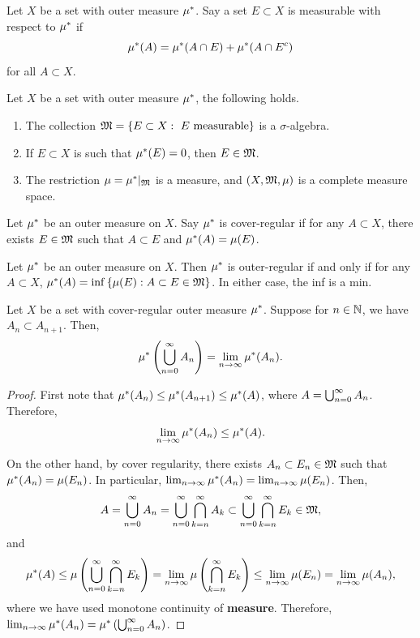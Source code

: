 \documentclass[a4paper]{article}
\begin{document}
\begin{defi}
  Let $X$ be a set with outer measure $\mu^*$. Say 
  a set $E \subset X$ is measurable with respect to 
  $\mu^*$ if 
  \[
  \mu^*(A) = \mu^*(A \cap E) + \mu^*(A \cap E^c) 
  \]
  for all $A \subset X$.
\end{defi}

\begin{thm}
  Let $X$ be a set with outer measure $\mu^*$, the following 
  holds. 
  \begin{enumerate}
    \item The collection $\mathfrak{M} = \left\{ E \subset X: \text{ 
      $E$ measurable} \right\}$ 
      is a $\sigma$-algebra.
    \item If $E \subset X$ is such that $\mu^*(E) = 0$, then 
    $E \in \mathfrak{M}$.
    \item The restriction $\mu = \mu^* \vert_{\mathfrak{M}}$ is a measure, 
    and $(X, \mathfrak{M}, \mu)$ is a complete measure space.
  \end{enumerate}
\end{thm}

\begin{defi}
  Let $\mu^*$ be an outer measure on $X$. Say $\mu^*$
  is cover-regular if for any $A \subset X$, there 
  exists $E \in \mathfrak{M}$ such that $A \subset E$ 
  and $\mu^*(A) = \mu(E)$.
\end{defi}

\begin{prop}
  Let $\mu^*$ be an outer measure on $X$. Then $\mu^*$
  is outer-regular if and only if for any $A \subset X$, 
  $\mu^*(A) = \inf \left\{ \mu(E) : A \subset E \in 
  \mathfrak{M} \right\}$. In either case, the inf is a min.
\end{prop}

\begin{prop}
  Let $X$ be a set with cover-regular outer measure 
  $\mu^*$. Suppose for $n \in \mathbb{N}$, we have $A_n \subset 
  A_{n+1}$. Then, 
  \[
  \mu^* \left( \bigcup_{n=0}^\infty A_n \right) 
  = \lim_{n \to \infty} \mu^*(A_n).
  \]
\end{prop}

\begin{proof}
  First note that $\mu^*(A_n) \leq \mu^*(A_{n+1}) 
  \leq \mu^*(A)$, where $A = \bigcup_{n=0}^\infty A_n$. 
  Therefore, 
  \[
    \lim_{n \to \infty} \mu^*(A_n) \leq \mu^*(A).
  \]

  On the other hand, by cover regularity, there exists 
  $A_n \subset E_n \in \mathfrak{M}$ such that $\mu^*(A_n) = \mu(E_n)$.
  In particular, $\lim_{n \to \infty} \mu^* (A_n) 
  = \lim_{n \to \infty} \mu(E_n)$. Then, 
  \[
  A = \bigcup_{n=0}^\infty A_n = \bigcup_{n=0}^\infty \bigcap_{k=n}^\infty A_k
  \subset \bigcup_{n=0}^\infty \bigcap_{k=n}^\infty E_k \in \mathfrak{M},
  \]
  and 
  \[
  \begin{aligned}
    \mu^*(A) 
    \leq \mu \left( \bigcup_{n=0}^\infty 
    \bigcap_{k=n}^\infty E_k \right) 
    = \lim_{n \to \infty} \mu \left( \bigcap_{k=n}^\infty 
    E_k \right) 
    \leq \lim_{n \to \infty} \mu (E_n) 
    = \lim_{n \to \infty} \mu(A_n),
  \end{aligned}
  \]
  where we have used monotone continuity of \textbf{measure}.
  Therefore, $\lim_{n \to \infty} \mu^* (A_n) = \mu^* 
  \left( \bigcup_{n=0}^\infty A_n \right)$.
\end{proof}
\end{document}
